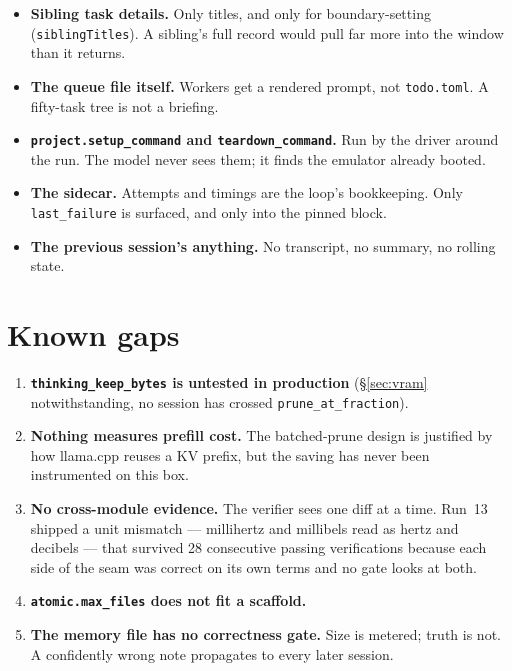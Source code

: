 \documentclass[11pt,a4paper]{article}
\newcommand{\file}[1]{\texttt{#1}}
\newcommand{\key}[1]{\texttt{#1}}
\begin{document}
\begin{itemize}[leftmargin=1.5em]
  \item \textbf{Sibling task details.} Only titles, and only for boundary-setting
  (\file{siblingTitles}). A sibling's full record would pull far more into the
  window than it returns.
  \item \textbf{The queue file itself.} Workers get a rendered prompt, not
  \file{todo.toml}. A fifty-task tree is not a briefing.
  \item \textbf{\key{project.setup\_command} and \key{teardown\_command}.} Run by
  the driver around the run. The model never sees them; it finds the emulator
  already booted.
  \item \textbf{The sidecar.} Attempts and timings are the loop's bookkeeping.
  Only \key{last\_failure} is surfaced, and only into the pinned block.
  \item \textbf{The previous session's anything.} No transcript, no summary, no
  rolling state.
\end{itemize}

\section{Known gaps}

\begin{enumerate}[leftmargin=1.5em]
  \item \textbf{\key{thinking\_keep\_bytes} is untested in production}
  (\S\ref{sec:vram} notwithstanding, no session has crossed
  \key{prune\_at\_fraction}).
  \item \textbf{Nothing measures prefill cost.} The batched-prune design is
  justified by how llama.cpp reuses a KV prefix, but the saving has never been
  instrumented on this box.
  \item \textbf{No cross-module evidence.} The verifier sees one diff at a time.
  Run~13 shipped a unit mismatch --- millihertz and millibels read as hertz and
  decibels --- that survived 28 consecutive passing verifications because each
  side of the seam was correct on its own terms and no gate looks at both.
  \item \textbf{\key{atomic.max\_files} does not fit a scaffold.}
  \item \textbf{The memory file has no correctness gate.} Size is metered;
  truth is not. A confidently wrong note propagates to every later session.
\end{enumerate}
\end{document}
